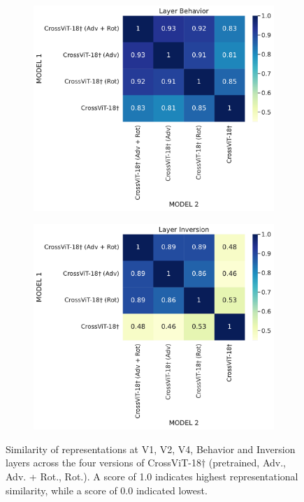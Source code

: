 \documentclass{article} %
\begin{document}
\begin{figure}[htb]
\begin{subfigure}{0.43\textwidth}
\end{subfigure}\hfil %
\medskip
\begin{subfigure}{0.43\textwidth}
  \includegraphics[width=\linewidth]{src/cka/layer_Behavior.pdf}
\end{subfigure}\hfil %
\begin{subfigure}{0.43\textwidth}
  \includegraphics[width=\linewidth]{src/cka/layer_Inversion.pdf}
\end{subfigure}\hfil %
\caption{Similarity of representations at V1, V2, V4, Behavior and Inversion layers across the four versions of CrossViT-18$\dagger$ (pretrained, Adv., Adv. + Rot., Rot.). A score of 1.0 indicates highest representational similarity, while a score of 0.0 indicated lowest.}
\label{fig:CKA-Analisis}
\end{figure}
\end{document}
